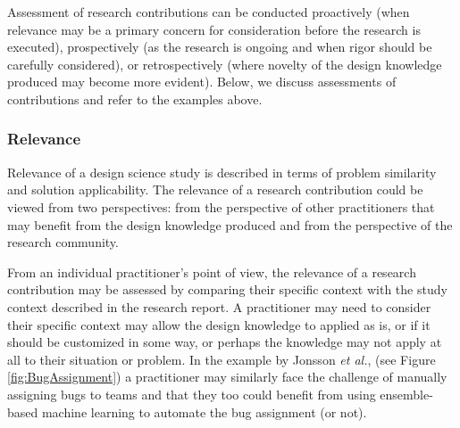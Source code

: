 \documentclass[graybox]{svmult}
\begin{document}
Assessment of research contributions can be conducted proactively (when relevance may be a primary concern for consideration before the research is executed), prospectively (as the research is ongoing and when rigor should be carefully considered), or retrospectively (where novelty of the design knowledge produced may become more evident).
Below, we discuss assessments of contributions and refer to the examples above.




\subsubsection{Relevance %
} 

Relevance of a design science study is described in terms of problem similarity and solution applicability. The relevance of a research contribution could be viewed from two perspectives: from the perspective of other practitioners that may benefit from the design knowledge produced and from the perspective of the research community. 

From an individual practitioner's point of view, the relevance of a research contribution may be assessed by comparing their specific context with the study context described in the research report. 
A practitioner may need to consider their specific context may allow the design knowledge to applied as is, or if it should be customized in some way, or perhaps the knowledge may not apply at all to their situation or problem.
In the example by Jonsson \emph{et al.}, (see Figure \ref{fig:BugAssignment}) a practitioner may  similarly face the challenge of manually assigning bugs to teams and  that they too could benefit from using ensemble-based machine learning to automate the bug assignment (or not).
\end{document}
